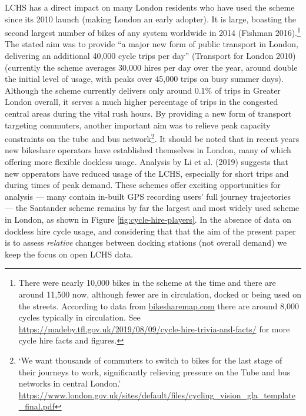 \documentclass[]{article}
\begin{document}
LCHS has a direct impact on many London residents who have used the scheme since its 2010 launch (making London an early adopter).
It is large, boasting the second largest number of bikes of any system worldwide in 2014 (Fishman 2016).\footnote{There were nearly 10,000 bikes in the scheme at the time and there are around 11,500 now, although fewer are in circulation, docked or being used on the streets.
  According to data from \href{https://bikesharemap.com/london/\#/12.384657071672539/-0.1195/51.5021/}{bikesharemap.com} there are around 8,000 cycles typically in circulation.
  See \url{https://madeby.tfl.gov.uk/2019/08/09/cycle-hire-trivia-and-facts/} for more cycle hire facts and figures.}
The stated aim was to provide ``a major new form of public transport in London, delivering an additional 40,000 cycle trips per day'' (Transport for London 2010) (currently the scheme averages 30,000 hires per day over the year, around double the initial level of usage, with peaks over 45,000 trips on busy summer days).
Although the scheme currently delivers only around 0.1\% of trips in Greater London overall, it serves a much higher percentage of trips in the congested central areas during the vital rush hours.
By providing a new form of transport targeting commuters, another important aim was to relieve peak capacity constraints on the tube and bus network\footnote{`We want thousands of commuters to switch to bikes for the last stage of their journeys to work, significantly relieving pressure on the Tube and bus networks in central London.' \url{https://www.london.gov.uk/sites/default/files/cycling_vision_gla_template_final.pdf}}. It should be noted that in recent years new bikeshare operators have established themselves in London, many of which offering more flexible dockless usage.
Analysis by Li et al. (2019) suggests that new opperators have reduced usage of the LCHS, especially for short trips and during times of peak demand.
These schemes offer exciting opportunities for analysis --- many contain in-built GPS recording users' full journey trajectories --- the Santander scheme remains by far the largest and most widely used scheme in London, as shown in Figure \ref{fig:cycle-hire-players}.
In the absence of data on dockless hire cycle usage, and considering that that the aim of the present paper is to assess \emph{relative} changes between docking stations (not overall demand) we keep the focus on open LCHS data.
\end{document}
